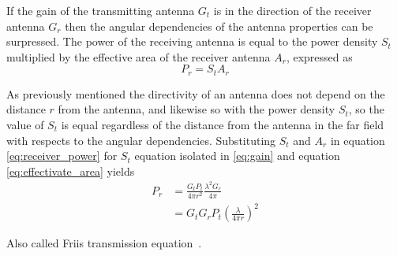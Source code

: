 If the gain of the transmitting antenna $G_t$ is in the direction of the receiver antenna $G_r$ then the angular dependencies of the antenna properties can be surpressed. The power of the receiving antenna is equal to the power density $S_t$ multiplied by the effective area of the receiver antenna $A_r$, expressed as
\begin{equation} \label{eq:receiver_power}
    P_r = S_t A_r
\end{equation} 

As previously mentioned the directivity of an antenna does not depend on the distance $r$ from the antenna, and likewise so with the power density $S_t$, so the value of $S_t$ is equal regardless of the distance from the antenna in the far field with respects to the angular dependencies. Substituting $S_t$ and $A_r$ in equation \ref{eq:receiver_power} for $S_t$ equation isolated in \ref{eq:gain} and equation \ref{eq:effectivate_area} yields
\begin{equation} \label{eq:friis}
    \begin{split}
        P_r & = \frac{G_t P_t}{4 \pi r^2} \frac{\lambda^2 G_r}{4 \pi} \\
        & = G_t  G_r P_t \left( \frac{\lambda}{4 \pi r} \right)^2
    \end{split}
\end{equation} 

Also called Friis transmission equation~\cite[pp. 8-10]{ant_eng_hk}.
